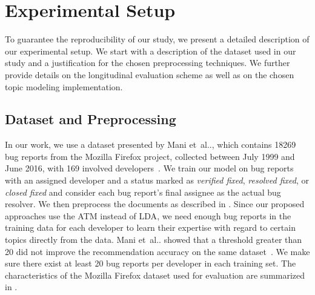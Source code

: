\documentclass[a4paper,twoside]{article}
\makeatletter
\newcommand{\mozff}{Mozilla Firefox}
\DeclareRobustCommand\onedot{\futurelet\@let@token\@onedot}
\def\@onedot{\ifx\@let@token.\else.\null\fi\xspace}
\def\etal{et~al\onedot}
\makeatother
\begin{document}
\section{Experimental Setup}
\label{section: experiment}
To guarantee the reproducibility of our study, we present a detailed description of our experimental setup.
We start with a description of the dataset used in our study and a justification for the chosen preprocessing techniques.
We further provide details on the longitudinal evaluation scheme as well as on the chosen topic modeling implementation.

\subsection{Dataset and Preprocessing}
\label{ssec: dataset}
In our work, we use a dataset presented by Mani \etal, which contains 18\thinspace{}269 bug reports from the Mozilla Firefox project, collected between July 1999 and June 2016, with 169 involved developers~\cite{Mani2019Deeptriage:Triaging}.
We train our model on bug reports with an assigned developer and a status marked as \textit{verified fixed}, \textit{resolved fixed}, or \textit{closed fixed} and consider each bug report's final assignee as the actual bug resolver.
We then preprocess the documents as described in .
Since our proposed approaches use the \ac{ATM} instead of \ac{LDA}, we need enough bug reports in the training data for each developer
to learn their expertise with regard to certain topics directly from the data.
Mani \etal  showed that a threshold greater than 20 did not improve the recommendation accuracy on the same dataset~\cite{Mani2019Deeptriage:Triaging}.
We make sure there exist at least 20 bug reports per developer in each training set.
The characteristics of the \mozff{} dataset used for evaluation are summarized in .

\end{document}
